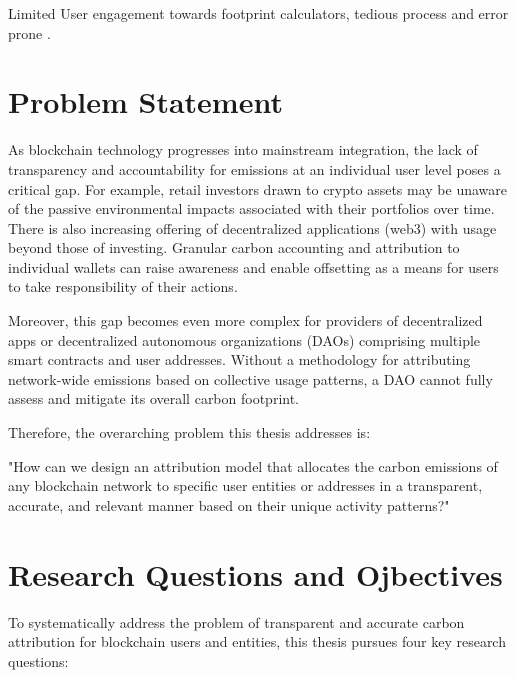 \documentclass[11pt]{report}
\begin{document}

Limited User engagement towards footprint calculators, tedious process and error prone \cite{saloOpportunitiesLimitationsCarbon2019,mulrowStateCarbonFootprint2019}.

\section{Problem Statement}

As blockchain technology progresses into mainstream integration, the lack of transparency and accountability for emissions at an individual user level poses a critical gap. For example, retail investors drawn to crypto assets may be unaware of the passive environmental impacts associated with their portfolios over time. There is also increasing offering of decentralized applications (web3) with usage beyond those of investing. Granular carbon accounting and attribution to individual wallets can raise awareness and enable offsetting as a means for users to take responsibility of their actions.

Moreover, this gap becomes even more complex for providers of decentralized apps or decentralized autonomous organizations (DAOs) comprising multiple smart contracts and user addresses. Without a methodology for attributing network-wide emissions based on collective usage patterns, a DAO cannot fully assess and mitigate its overall carbon footprint.

Therefore, the overarching problem this thesis addresses is:

"How can we design an attribution model that allocates the carbon emissions of any blockchain network to specific user entities or addresses in a transparent, accurate, and relevant manner based on their unique activity patterns?"


\section{Research Questions and Ojbectives}

To systematically address the problem of transparent and accurate carbon attribution for blockchain users and entities, this thesis pursues four key research questions:
\end{document}
